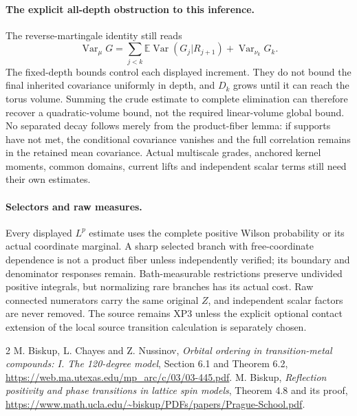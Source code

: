 \documentclass[11pt]{article}
\newcommand{\E}{\mathbb E}
\newcommand{\Var}{\operatorname{Var}}
\begin{document}
\paragraph{The explicit all-depth obstruction to this inference.}
The reverse-martingale identity still reads
\[
 \Var_\mu G=\sum_{j<k}\E\Var(G_j|R_{j+1})+\Var_{\nu_k}G_k.
\]
The fixed-depth bounds control each displayed increment. They do not bound the final
inherited covariance uniformly in depth, and $D_k$ grows until it can reach the torus
volume. Summing the crude estimate to complete elimination can therefore recover a
quadratic-volume bound, not the required linear-volume global bound.
No separated decay follows merely from the product-fiber lemma: if supports have not
met, the conditional covariance vanishes and the full correlation remains in the retained
mean covariance. Actual multiscale grades, anchored kernel moments, common domains,
current lifts and independent scalar terms still need their own estimates.

\paragraph{Selectors and raw measures.}
Every displayed $L^p$ estimate uses the complete positive Wilson probability or its
actual coordinate marginal. A sharp selected branch with free-coordinate dependence is
not a product fiber unless independently verified; its boundary and denominator responses
remain. Bath-measurable restrictions preserve undivided positive integrals, but normalizing
rare branches has its actual cost. Raw connected numerators carry the same original $Z$,
and independent scalar factors are never removed. The source remains XP3 unless the
explicit optional contact extension of the local source transition calculation is separately chosen.

\begin{thebibliography}{2}
 M. Biskup, L. Chayes and Z. Nussinov, \emph{Orbital ordering in transition-metal
compounds: I. The 120-degree model}, Section 6.1 and Theorem 6.2,
\url{https://web.ma.utexas.edu/mp_arc/c/03/03-445.pdf}.
 M. Biskup, \emph{Reflection positivity and phase transitions in lattice spin models},
Theorem 4.8 and its proof,
\url{https://www.math.ucla.edu/~biskup/PDFs/papers/Prague-School.pdf}.
\end{thebibliography}
\end{document}
